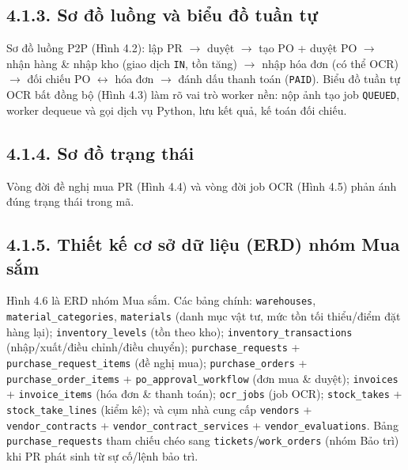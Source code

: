 \subsection*{4.1.3. Sơ đồ luồng và biểu đồ tuần tự}
Sơ đồ luồng P2P (Hình 4.2): lập PR $\rightarrow$ duyệt $\rightarrow$ tạo PO + duyệt PO $\rightarrow$ nhận hàng \& nhập kho (giao dịch \texttt{IN}, tồn tăng) $\rightarrow$ nhập hóa đơn (có thể OCR) $\rightarrow$ đối chiếu PO $\leftrightarrow$ hóa đơn $\rightarrow$ đánh dấu thanh toán (\texttt{PAID}). Biểu đồ tuần tự OCR bất đồng bộ (Hình 4.3) làm rõ vai trò worker nền: nộp ảnh tạo job \texttt{QUEUED}, worker dequeue và gọi dịch vụ Python, lưu kết quả, kế toán đối chiếu.



\subsection*{4.1.4. Sơ đồ trạng thái}
Vòng đời đề nghị mua PR (Hình 4.4) và vòng đời job OCR (Hình 4.5) phản ánh đúng trạng thái trong mã.



\subsection*{4.1.5. Thiết kế cơ sở dữ liệu (ERD) nhóm Mua sắm}
Hình 4.6 là ERD nhóm Mua sắm. Các bảng chính: \texttt{warehouses}, \texttt{material\_categories}, \texttt{materials} (danh mục vật tư, mức tồn tối thiểu/điểm đặt hàng lại); \texttt{inventory\_levels} (tồn theo kho); \texttt{inventory\_transactions} (nhập/xuất/điều chỉnh/điều chuyển); \texttt{purchase\_requests} + \texttt{purchase\_request\_items} (đề nghị mua); \texttt{purchase\_orders} + \texttt{purchase\_order\_items} + \texttt{po\_approval\_workflow} (đơn mua \& duyệt); \texttt{invoices} + \texttt{invoice\_items} (hóa đơn \& thanh toán); \texttt{ocr\_jobs} (job OCR); \texttt{stock\_takes} + \texttt{stock\_take\_lines} (kiểm kê); và cụm nhà cung cấp \texttt{vendors} + \texttt{vendor\_contracts} + \texttt{vendor\_contract\_services} + \texttt{vendor\_evaluations}. Bảng \texttt{purchase\_requests} tham chiếu chéo sang \texttt{tickets}/\texttt{work\_orders} (nhóm Bảo trì) khi PR phát sinh từ sự cố/lệnh bảo trì.

